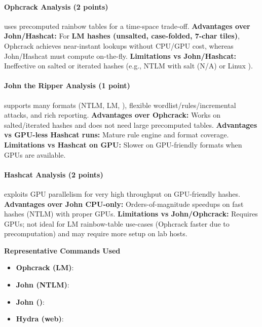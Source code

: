 
\paragraph{Ophcrack Analysis (2 points)}
{\small {} uses precomputed rainbow tables for a time-space trade-off. \textbf{Advantages over John/Hashcat:} For \textbf{LM hashes (unsalted, case-folded, 7-char tiles)}, Ophcrack achieves near-instant lookups without CPU/GPU cost, whereas John/Hashcat must compute on-the-fly. \textbf{Limitations vs John/Hashcat:} Ineffective on salted or iterated hashes (e.g., NTLM with salt (N/A) or Linux ).}

\paragraph{John the Ripper Analysis (1 point)}
{\small {} supports many formats (NTLM, LM, ), flexible wordlist/rules/incremental attacks, and rich reporting. \textbf{Advantages over Ophcrack:} Works on salted/iterated hashes and does not need large precomputed tables. \textbf{Advantages vs GPU-less Hashcat runs:} Mature rule engine and format coverage. \textbf{Limitations vs Hashcat on GPU:} Slower on GPU-friendly formats when GPUs are available.}

\paragraph{Hashcat Analysis (2 points)}
{\small {} exploits GPU parallelism for very high throughput on GPU-friendly hashes. \textbf{Advantages over John CPU-only:} Orders-of-magnitude speedups on fast hashes (NTLM) with proper GPUs. \textbf{Limitations vs John/Ophcrack:} Requires GPUs; not ideal for LM rainbow-table use-cases (Ophcrack faster due to precomputation) and may require more setup on lab hosts.}

\noindent\textbf{Representative Commands Used}
\begin{itemize}[nosep]
  \item \textbf{Ophcrack (LM)}: 
  \item \textbf{John (NTLM)}: 
  \item \textbf{John ()}: 
  \item \textbf{Hydra (web)}: 
\end{itemize}

